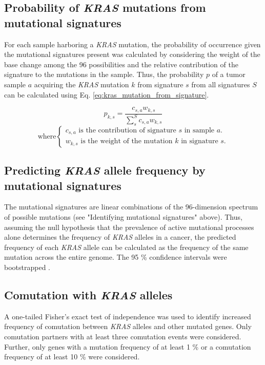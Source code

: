 \documentclass[english, 10pt, letterpaper]{article}
\newcommand{\KRAS}{\emph{KRAS}}
\begin{document}
\subsection*{Probability of \KRAS{} mutations from mutational signatures}

For each sample harboring a \KRAS{} mutation, the probability of occurrence given the mutational signatures present was calculated by considering the weight of the base change among the 96 possibilities and the relative contribution of the signature to the mutations in the sample. 
Thus, the probability $p$ of a tumor sample $a$ acquiring the \KRAS{} mutation $k$ from signature $s$ from all signatures $S$ can be calculated using Eq. \ref{eq:kras_mutation_from_signature}.

\begin{equation}
\label{eq:kras_mutation_from_signature}
p_{k,s} = \frac{c_{s,a} w_{k,s}}{\sum_{s}^{S} c_{s,a} w_{k,s}}
\end{equation}
\begin{equation*}
    \text{where} 
    \begin{cases}
        c_{s,a} \text{ is the contribution of signature $s$ in sample $a$.} \\
        w_{k,s} \text{ is the weight of the mutation $k$ in signature $s$.}
    \end{cases}
\end{equation*}


\subsection*{Predicting \KRAS{} allele frequency by mutational signatures}

The mutational signatures are linear combinations of the 96-dimension spectrum of possible mutations (see "Identifying mutational signatures" above).
Thus, assuming the null hypothesis that the prevalence of active mutational processes alone determines the frequency of \KRAS{} alleles in a cancer, the predicted frequency of each \KRAS{} allele can be calculated as the frequency of the same mutation across the entire genome.
The 95 \% confidence intervals were bootstrapped \cite{R-boot}.


\subsection*{Comutation with \KRAS{} alleles}

A one-tailed Fisher’s exact test of independence was used to identify increased frequency of comutation between \KRAS{} alleles and other mutated genes. Only comutation partners with at least three comutation events were considered. Further, only genes with a mutation frequency of at least 1 \% or a comutation frequency of at least 10 \% were considered. 
\end{document}
